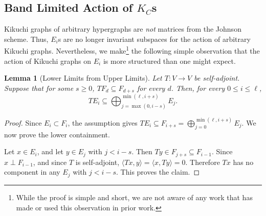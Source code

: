 \documentclass
[11pt,letterpaper]
{article}
\newtheorem{lemma}[theorem]{Lemma}
\newtheorem{remark}[theorem]{Remark}
\begin{document}


\subsection{Band Limited Action of $K_C$s}
Kikuchi graphs of arbitrary hypergraphs are \emph{not} matrices from the Johnson scheme. Thus, $E_i$s are no longer invariant subspaces for the action of arbitrary Kikuchi graphs. Nevertheless, we make\footnote{While the proof is simple and short, we are not aware of any work that has made or used this observation in prior work.} the following simple observation that the action of Kikuchi graphs on $E_i$ is more structured than one might expect. 
\begin{lemma}[Lower Limits from Upper Limits] \label{lem:lower-from-upper}
Let \(T:V\to V\) be self-adjoint. Suppose that for some \(s\ge 0\), $T F_d\subseteq F_{d+s}$ for every \(d\). Then, for every \(0\le i\le \ell\),
\[
T E_i
\subseteq
\bigoplus_{j=\max(0,i-s)}^{\min(\ell,i+s)} E_j.
\]
\end{lemma}

\begin{proof}
Since \(E_i\subset F_i\), the assumption gives
$T E_i\subseteq F_{i+s} = \bigoplus_{j=0}^{\min(\ell,i+s)} E_j$.
We now prove the lower containment.

Let \(x\in E_i\), and let \(y\in E_j\) with \(j<i-s\). Then
$T y\in F_{j+s}\subseteq F_{i-1}$.
Since \(x\perp F_{i-1}\), and since \(T\) is self-adjoint,
$\langle T x,y\rangle
=
\langle x,T y\rangle
=
0$.
Therefore \(T x\) has no component in any \(E_j\) with \(j<i-s\). This proves the claim.
\end{proof}
\end{document}
